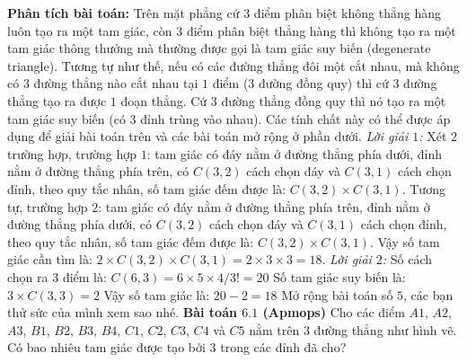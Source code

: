 \begin{multicols}{2}
\begin{figure}[H]
			\vspace*{-5pt}
		\end{figure}
	\vskip 0.1cm
	\textbf{\color{toancuabi}Phân tích bài toán:}
	\vskip 0.1cm
	Trên mặt phẳng cứ $3$ điểm phân biệt không thẳng hàng luôn tạo ra một tam giác, còn $3$ điểm phân biệt thẳng hàng thì không tạo ra một tam giác thông thưởng mà thường được gọi là tam giác suy biến (degenerate triangle). Tương tự như thế, nếu có các đường thẳng đôi một cắt nhau, mà không có $3$ đường thẳng nào cắt nhau tại $1$ điểm ($3$ đường đồng quy) thì cứ $3$ đường thẳng tạo ra được $1$ đoạn thẳng. Cứ $3$ đường thẳng đồng quy thì nó tạo ra một tam giác suy biến (có $3$ đỉnh trùng vào nhau). Các tính chất này có thể được áp dụng để giải bài toán trên và các bài toán mở rộng ở phần dưới.
	\vskip 0.1cm
	\textit{Lời giải $1$:}
	Xét $2$ trường hợp, trường hợp $1$: tam giác có đáy nằm ở đường thẳng phía dưới, đỉnh nằm ở đường thẳng phía trên, có $C(3,2)$ cách chọn đáy và $C(3,1)$ cách chọn đỉnh, theo quy tắc nhân, số tam giác đếm được là: $C(3,2)\times C(3,1)$. Tương tự, trường hợp $2$: tam giác có đáy nằm ở đường thẳng phía trên, đỉnh nằm ở đường thẳng phía dưới, có $C(3,2)$ cách chọn đáy và $C(3,1)$ cách chọn đỉnh, theo quy tắc nhân, số tam giác đếm được là: $C(3,2)\times C(3,1)$.
	\vskip 0.1cm
	Vậy số tam giác cần tìm là: $2\times C(3,2)\times C(3,1) = 2\times3\times3=18$.
	\vskip 0.1cm
	\textit{Lời giải $2$:}
	Số cách chọn ra $3$ điểm là: $C(6,3)=6\times 5\times4/3!=20$
	\vskip 0.1cm
	Số tam giác suy biến là: $3\times C(3,3)=2$
	\vskip 0.1cm
	Vậy số tam giác là: $20-2=18$
	\vskip 0.1cm
	Mở rộng bài toán số $5$, các bạn thử sức của mình xem sao nhé.
	\vskip 0.1cm
		\textbf{\color{toancuabi}Bài toán $\pmb{6.1}$ (Apmops)}
		\vskip 0.1cm
		Cho các điểm $A1$, $A2$, $A3$, $B1$, $B2$, $B3$, $B4$, $C1$, $C2$, $C3$, $C4$ và $C5$ nằm trên $3$ đường thẳng như hình vẽ. Có bao nhiêu tam giác được tạo bởi $3$ trong các đỉnh đã cho?
		\begin{figure}[H]
			\centering
			\vspace*{-5pt}
			\captionsetup{labelformat=empty, justification=centering}
			\begin{tikzpicture}[toancuabi, scale=0.9]

\end{tikzpicture}
\end{figure}
\end{multicols}
